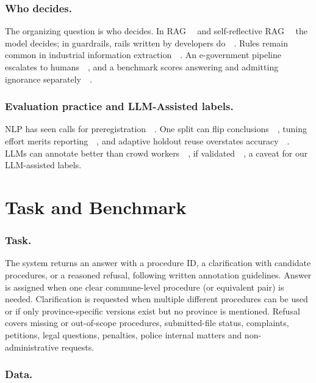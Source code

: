 \documentclass[runningheads]{llncs}
\begin{document}
\subsubsection{Who decides.}

{The organizing question is who decides. In RAG~~\cite{lewis2020} and self-reflective RAG~~\cite{asai2024} the model decides; in guardrails, rails written by developers do~~\cite{rebedea2023}. Rules remain common in industrial information extraction~~\cite{chiticariu2013}. An e-government pipeline escalates to humans~~\cite{kaplan2026}, and a benchmark scores answering and admitting ignorance separately~~\cite{samson2026}.}

\subsubsection{Evaluation practice and LLM-Assisted labels.}

{NLP has seen calls for preregistration~~\cite{vanmiltenburg2021}. One split can flip conclusions~~\cite{gorman2019}, tuning effort merits reporting~~\cite{dodge2019}, and adaptive holdout reuse overstates accuracy~~\cite{dwork2015}. LLMs can annotate better than crowd workers~~\cite{gilardi2023}, if validated~~\cite{pangakis2023,reiss2023}, a caveat for our LLM-assisted labels.}

\section{Task and Benchmark}\label{sec:data}

\subsubsection{Task.}

{The system returns an answer with a procedure ID, a clarification with candidate procedures, or a reasoned refusal, following written annotation guidelines. Answer is assigned when one clear commune-level procedure (or equivalent pair) is needed. Clarification is requested when multiple different procedures can be used or if only province-specific versions exist but no province is mentioned. Refusal covers missing or out-of-scope procedures, submitted-file status, complaints, petitions, legal questions, penalties, police internal matters and non-administrative requests.}

\subsubsection{Data.}
\end{document}
